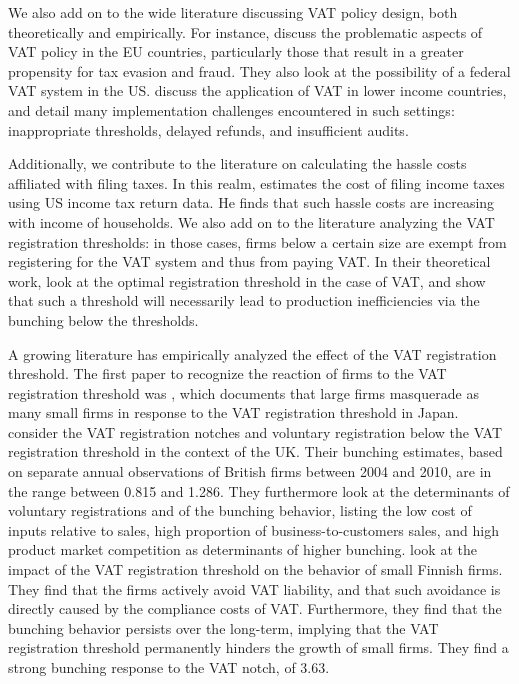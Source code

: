 
We also add on to the wide literature discussing VAT policy design, both theoretically and empirically. For instance, \citet{keen2006vat} discuss the problematic aspects of VAT policy in the EU countries, particularly those that result in a greater propensity for tax evasion and fraud. They also look at the possibility of a federal VAT system in the US. \citet{bird2007vat} discuss the application of VAT in lower income countries, and detail many implementation challenges encountered in such settings: inappropriate thresholds, delayed refunds, and insufficient audits.

Additionally, we contribute to the literature on calculating the hassle costs affiliated with filing taxes. In this realm, \citet{benzarti2017taxing} estimates the cost of filing income taxes using US income tax return data. He finds that such hassle costs are increasing with income of households. We also add on to the literature analyzing the VAT registration thresholds: in those cases, firms below a certain size are exempt from registering for the VAT system and thus from paying VAT. In their theoretical work, \citet{keen2004optimal} look at the optimal registration threshold in the case of VAT, and show that such a threshold will necessarily lead to production inefficiencies via the bunching below the thresholds. 

A growing literature has empirically analyzed the effect of the VAT registration threshold. The first paper to recognize the reaction of firms to the VAT registration threshold was \citet{onji2009response}, which documents that large firms masquerade as many small firms in response to the VAT registration threshold in Japan. \citet{liu2017vat} consider the VAT registration notches and voluntary registration below the VAT registration threshold in the context of the UK. Their bunching estimates, based on separate annual observations of British firms between 2004 and 2010, are in the range between 0.815 and 1.286. They furthermore look at the determinants of voluntary registrations and of the bunching behavior, listing the low cost of inputs relative to sales, high proportion of business-to-customers sales, and high product market competition as determinants of higher bunching. \citet{harju2016effects} look at the impact of the VAT registration threshold on the behavior of small Finnish firms. They find that the firms actively avoid VAT liability, and that such avoidance is directly caused by the compliance costs of VAT. Furthermore, they find that the bunching behavior persists over the long-term, implying that the VAT registration threshold permanently hinders the growth of small firms. They find a strong bunching response to the VAT notch, of 3.63. 

